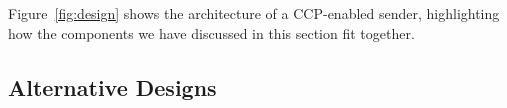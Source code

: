  
Figure~\ref{fig:design} shows the architecture of a CCP-enabled sender, highlighting how the components we have discussed in this section fit together. 



\subsection{Alternative Designs}
\label{sec:design:alternatives}




